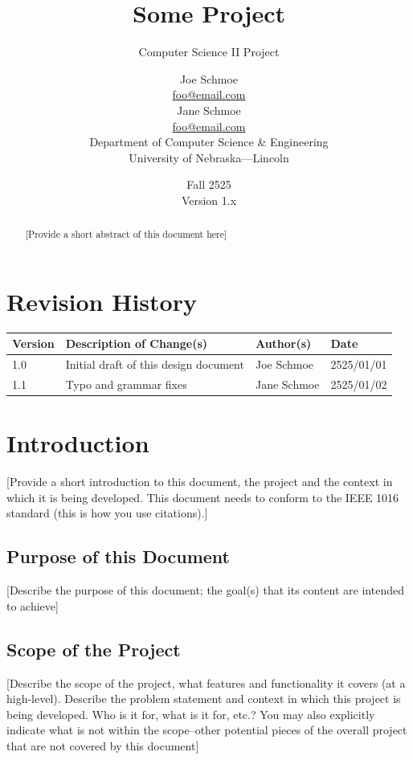 \documentclass[12pt]{scrartcl} %
\title{Some Project}
\subtitle{Computer Science II Project}
\author{Joe Schmoe\\
        \href{mailto:foo@email.com}{foo@email.com} \\
        Jane Schmoe\\
        \href{mailto:foo@email.com}{foo@email.com} \\
        Department of Computer Science \& Engineering\\
        University of Nebraska---Lincoln\\
}
\date{Fall 2525 \\
      Version 1.x
}
\begin{document}
\maketitle
\thispagestyle{empty}

\vfill

\begin{abstract}
[Provide a short abstract of this document here]
\end{abstract}

\newpage
\clearpage
\setcounter{page}{1}
\section*{Revision History}

\begin{tabular}{|l|l|l|l|}
\hline
Version & Description of Change(s) & Author(s) & Date \\
\hline
1.0 & Initial draft of this design document & Joe Schmoe & 2525/01/01 \\
\hline
1.1 & Typo and grammar fixes & Jane Schmoe & 2525/01/02 \\
\hline
\end{tabular}

\newpage
\tableofcontents

\newpage
\section{Introduction}

[Provide a short introduction to this document, the project and the context in which it is being developed.  This document needs to conform to the 
IEEE 1016 standard \cite{IEEE1016} (this is how you use citations).]

\subsection{Purpose of this Document}

[Describe the purpose of this document; the goal(s) that its content are intended to achieve]

\subsection{Scope of the Project}

[Describe the scope of the project, what features and functionality it covers (at a high-level).  Describe the problem statement and context in which this project is being developed.  Who is it for, what is it for, etc.?  You may also explicitly indicate what is not within the scope--other potential pieces of the overall project that are not covered by this document]
\end{document}

